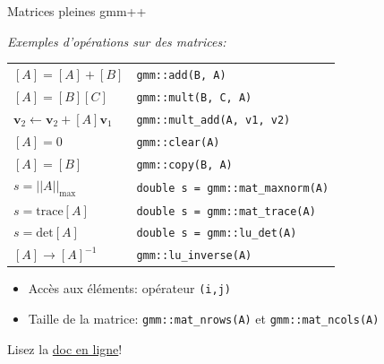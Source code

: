 \documentclass[
mode=present,    %
paper=a4paper,   %
orient=landscape,
display=slides,   %
size=10pt,     %
style=romain   %
]{powerdot}
\begin{document}
\begin{slide}[method=file, toc=]{Matrices pleines gmm++}  %

\emph{Exemples d'opérations sur des matrices:}

\bigskip

\begin{tabular}{l|l}
  $[A]=[A]+[B]$                                             & \verb$gmm::add(B, A)$ \\
  $[A]=[B] [C]$                                             & \verb$gmm::mult(B, C, A)$\\
  $\boldsymbol{v}_2\leftarrow\boldsymbol{v}_2+[A] \boldsymbol{v}_1$ & \verb$gmm::mult_add(A, v1, v2)$\\
  $ [A] = 0$                                                & \verb$gmm::clear(A)$ \\
  $ [A] = [B]$                                              & \verb$gmm::copy(B, A)$ \\
  $ s = ||A||_{\max}$                                       & \verb$double s = gmm::mat_maxnorm(A)$ \\
  $ s = \text{trace} [A]$                                   & \verb$double s = gmm::mat_trace(A)$ \\
  $ s = \text{det} [A]$                                     & \verb$double s = gmm::lu_det(A)$ \\
  $ [A]\rightarrow [A]^{-1}$                                & \verb$gmm::lu_inverse(A)$ \\
\end{tabular}

\bigskip

\begin{itemize}
\item Accès aux éléments: opérateur \verb$(i,j)$
\item Taille de la matrice: \verb$gmm::mat_nrows(A)$ et \verb$gmm::mat_ncols(A)$
\end{itemize}



Lisez la \href{http://download.gna.org/getfem/html/homepage/userdoc/index.html}{doc en ligne}!

\end{slide}
\end{document}
